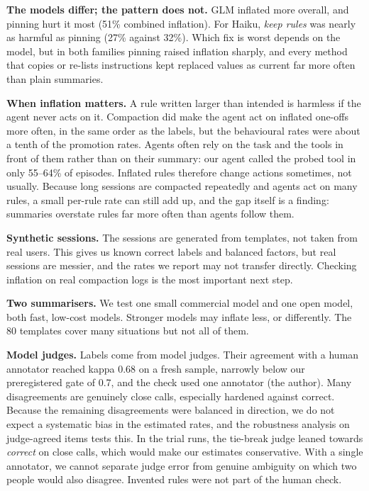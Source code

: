 \documentclass[fleqn,10pt]{wlscirep}
\begin{document}
\textbf{The models differ; the pattern does not.} GLM inflated more overall, and pinning hurt it most (51\% combined inflation). For Haiku, \emph{keep rules} was nearly as harmful as pinning (27\% against 32\%). Which fix is worst depends on the model, but in both families pinning raised inflation sharply, and every method that copies or re-lists instructions kept replaced values as current far more often than plain summaries.

\textbf{When inflation matters.} A rule written larger than intended is harmless if the agent never acts on it. Compaction did make the agent act on inflated one-offs more often, in the same order as the labels, but the behavioural rates were about a tenth of the promotion rates. Agents often rely on the task and the tools in front of them rather than on their summary: our agent called the probed tool in only 55--64\% of episodes. Inflated rules therefore change actions sometimes, not usually. Because long sessions are compacted repeatedly and agents act on many rules, a small per-rule rate can still add up, and the gap itself is a finding: summaries overstate rules far more often than agents follow them.

\textbf{Synthetic sessions.} The sessions are generated from templates, not taken from real users. This gives us known correct labels and balanced factors, but real sessions are messier, and the rates we report may not transfer directly. Checking inflation on real compaction logs is the most important next step.

\textbf{Two summarisers.} We test one small commercial model and one open model, both fast, low-cost models. Stronger models may inflate less, or differently. The 80 templates cover many situations but not all of them.

\textbf{Model judges.} Labels come from model judges. Their agreement with a human annotator reached kappa 0.68 on a fresh sample, narrowly below our preregistered gate of 0.7, and the check used one annotator (the author). Many disagreements are genuinely close calls, especially hardened against correct. Because the remaining disagreements were balanced in direction, we do not expect a systematic bias in the estimated rates, and the robustness analysis on judge-agreed items tests this. In the trial runs, the tie-break judge leaned towards \emph{correct} on close calls, which would make our estimates conservative. With a single annotator, we cannot separate judge error from genuine ambiguity on which two people would also disagree. Invented rules were not part of the human check.
\end{document}
